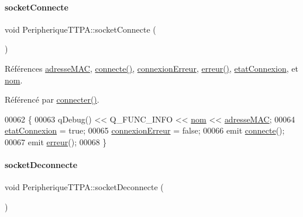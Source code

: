 \paragraph{\texorpdfstring{socket\+Connecte}{socketConnecte}}
{\footnotesize\ttfamily void Peripherique\+T\+T\+P\+A\+::socket\+Connecte (\begin{DoxyParamCaption}{ }\end{DoxyParamCaption})\hspace{0.3cm}{\ttfamily [slot]}}



Références \hyperlink{class_peripherique_t_t_p_a_a444063230c83cf81eff8a3a55736f2cf}{adresse\+M\+AC}, \hyperlink{class_peripherique_t_t_p_a_ae95f1fe6bb1908b5eb2d34a469f7f873}{connecte()}, \hyperlink{class_peripherique_t_t_p_a_a9602c4662641984ea44bf6caaac6e94c}{connexion\+Erreur}, \hyperlink{class_peripherique_t_t_p_a_a7a31d9f923cc71a42d0dab80d9332eb6}{erreur()}, \hyperlink{class_peripherique_t_t_p_a_a3aaac9f045cc038777895afe18411e58}{etat\+Connexion}, et \hyperlink{class_peripherique_t_t_p_a_afafe3566b4b5357819811218b9a4244f}{nom}.



Référencé par \hyperlink{class_peripherique_t_t_p_a_a8afa92f7c3ae6e1edc30f5c8b386af81}{connecter()}.


\begin{DoxyCode}
00062 \{
00063     qDebug() << Q\_FUNC\_INFO << \hyperlink{class_peripherique_t_t_p_a_afafe3566b4b5357819811218b9a4244f}{nom} << \hyperlink{class_peripherique_t_t_p_a_a444063230c83cf81eff8a3a55736f2cf}{adresseMAC};
00064     \hyperlink{class_peripherique_t_t_p_a_a3aaac9f045cc038777895afe18411e58}{etatConnexion} = \textcolor{keyword}{true};
00065     \hyperlink{class_peripherique_t_t_p_a_a9602c4662641984ea44bf6caaac6e94c}{connexionErreur} = \textcolor{keyword}{false};
00066     emit \hyperlink{class_peripherique_t_t_p_a_ae95f1fe6bb1908b5eb2d34a469f7f873}{connecte}();
00067     emit \hyperlink{class_peripherique_t_t_p_a_a7a31d9f923cc71a42d0dab80d9332eb6}{erreur}();
00068 \}
\end{DoxyCode}
\mbox{\label{class_peripherique_t_t_p_a_adb04c45864ea56a80a0716cde0a31856}} 
\paragraph{\texorpdfstring{socket\+Deconnecte}{socketDeconnecte}}
{\footnotesize\ttfamily void Peripherique\+T\+T\+P\+A\+::socket\+Deconnecte (\begin{DoxyParamCaption}{ }\end{DoxyParamCaption})\hspace{0.3cm}{\ttfamily [slot]}}



